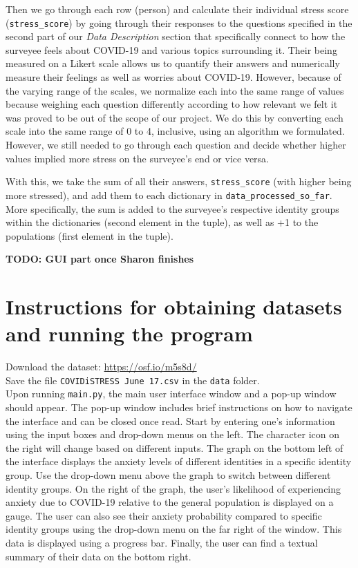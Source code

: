 \documentclass[fontsize=11pt]{article}
\begin{document}
	Then we go through each row (person) and calculate their individual stress score (\texttt{stress\_score}) by going through their responses to the questions specified in the second part of our \textit{Data Description} section that specifically connect to how the surveyee feels about COVID-19 and various topics surrounding it. Their being measured on a Likert scale allows us to quantify their answers and numerically measure their feelings as well as worries about COVID-19. 
	However, because of the varying range of the scales, we normalize each into the same range of values because weighing each question differently according to how relevant we felt it was proved to be out of the scope of our project. We do this by converting each scale into the same range of 0 to 4, inclusive, using an algorithm we formulated. 
	However, we still needed to go through each question and decide whether higher values implied more stress on the surveyee's end or vice versa.
	
	With this, we take the sum of all their answers, \texttt{stress\_score} (with higher being more stressed), and add them to each dictionary in \texttt{data\_processed\_so\_far}. More specifically, the sum is added to the surveyee’s respective identity groups within the dictionaries (second element in the tuple), as well as +1 to the populations (first element in the tuple). 

	\textbf{TODO: GUI part once Sharon finishes}

	\section*{Instructions for obtaining datasets and running the program}
	Download the dataset: \url{https://osf.io/m5s8d/} \\
	Save the file \texttt{COVIDiSTRESS June 17.csv} in the \texttt{data} folder. \\
	
	Upon running \texttt{main.py}, the main user interface window and a pop-up window should appear. The pop-up window includes brief instructions on how to navigate the interface and can be closed once read. Start by entering one’s information using the input boxes and drop-down menus on the left. The character icon on the right will change based on different inputs. The graph on the bottom left of the interface displays the anxiety levels of different identities in a specific identity group. Use the drop-down menu above the graph to switch between different identity groups. On the right of the graph, the user’s likelihood of experiencing anxiety due to COVID-19 relative to the general population is displayed on a gauge. The user can also see their anxiety probability compared to specific identity groups using the drop-down menu on the far right of the window. This data is displayed using a progress bar. Finally, the user can find a textual summary of their data on the bottom right.
	
\end{document}
